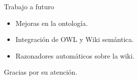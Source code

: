 \documentclass{beamer}
\begin{document}
\begin{frame}{Trabajo a futuro}
\begin{LARGE}
	\begin{itemize}
		\item Mejoras en la ontología.
		\item Integración de OWL y Wiki semántica.
		\item Razonadores automáticos sobre la wiki.
	\end{itemize}
\end{LARGE}
\end{frame}

\begin{frame}[c]{}
	\begin{center}
		Gracias por su atención.
	\end{center}
\end{frame}
\end{document}
